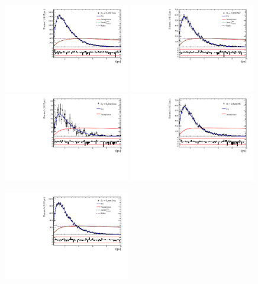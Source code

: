 \begin{figure}[h]
\includegraphics[height=!,width=0.49\textwidth]{figs/Acceptance/adaptive_N4/timeAccRatioFit_norm_Run2_t0.pdf}
\includegraphics[height=!,width=0.49\textwidth]{figs/Acceptance/adaptive_N4/timeAccRatioFit_norm_mc_Run2_t0.pdf}
\includegraphics[height=!,width=0.49\textwidth]{figs/Acceptance/adaptive_N4/timeAccRatioFit_signal_B0_Run2_t0.pdf}
\includegraphics[height=!,width=0.49\textwidth]{figs/Acceptance/adaptive_N4/timeAccRatioFit_signal_mc_Run2_t0.pdf}
\caption{}
\label{fig:}
\includegraphics[height=!,width=0.49\textwidth]{figs/Acceptance/adaptive_N4/timeAccRatioFit_norm_Run2_t1.pdf}

\end{figure}
